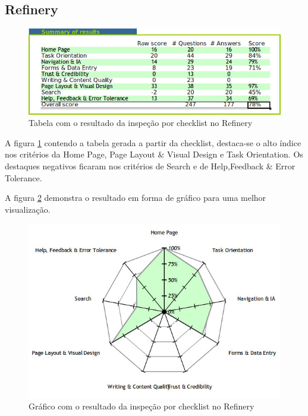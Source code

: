 \subsection{Refinery}

\begin{figure}[here]
\includegraphics[width=130mm]{images/refinery_result_checklist_table.jpg}
\caption{Tabela com o resultado da inspeção por checklist no Refinery}
\label{fig:resultado_checklist_refinery_tabela}
\end{figure}

A figura \ref{fig:resultado_checklist_refinery_tabela} contendo a tabela gerada a partir da checklist, destaca-se o alto índice nos critérios da Home Page, Page Layout \& Visual Design e Task Orientation. Os destaques negativos ficaram nos critérios de Search e de Help,Feedback \& Error Tolerance. 

A figura \ref{fig:resultado_checklist_refinery_grafico} demonstra o resultado em forma de gráfico para uma melhor visualização.

\begin{figure}[here]
\includegraphics[scale=0.5]{images/refinery_result_checklist_graph.jpg}
\caption{Gráfico com o resultado da inspeção por checklist no Refinery}
\label{fig:resultado_checklist_refinery_grafico}
\end{figure}

